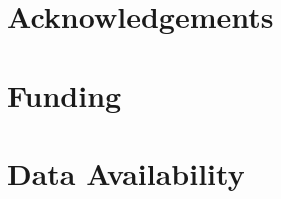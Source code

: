 \documentclass[12pt,a4paper]{article}
\newif\ifshowplaceholders
\newcommand{\outlineplaceholder}{%
\ifshowplaceholders
\par\noindent\textit{[Content to be developed.]}\par\medskip
\fi
}
\begin{document}
\section*{Acknowledgements}
\outlineplaceholder

\section*{Funding}
\outlineplaceholder

\section*{Data Availability}
\outlineplaceholder

%
% 
% 
\end{document}
